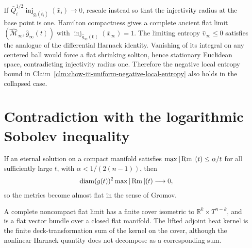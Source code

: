 \begin{lemma}
\label{lem:chow-iii-collapsed-entropy-limit}


If \(\bar Q_i^{1/2}\operatorname{inj}_{g_i(\bar t_i)}(\bar x_i)\to0\), rescale instead so that
the injectivity radius at the base point is one.  Hamilton compactness gives a
complete ancient flat limit \((\widehat{\mathcal M}_\infty,\widehat g_\infty(t))\)
with \(\operatorname{inj}_{\widehat g_\infty(0)}(\bar x_\infty)=1\).  The limiting entropy
\(\widehat v_\infty\le0\) satisfies the analogue of the differential Harnack
identity.  Vanishing of its integral on any centered ball would force a flat
shrinking soliton, hence stationary Euclidean space, contradicting injectivity
radius one.  Therefore the negative local entropy bound in Claim~\ref{clm:chow-iii-uniform-negative-local-entropy} also holds in the collapsed case.
\end{lemma}

\section{Contradiction with the logarithmic Sobolev inequality}

\begin{lemma}
\label{lem:chow-iii-type-iii-curvature-gap}

If an eternal solution on a compact manifold satisfies
\(\max|\operatorname{Rm}|(t)\le\alpha/t\) for all sufficiently large \(t\), with
\(\alpha<1/(2(n-1))\), then
\[
\operatorname{diam}(g(t))^2\max|\operatorname{Rm}|(t)\longrightarrow0,
\]
so the metrics become almost flat in the sense of Gromov.
\end{lemma}

\begin{remark}
\label{rem:chow-iii-flat-limit-cover}


A complete noncompact flat limit has a finite cover isometric to
\(\mathbb R^k\times T^{n-k}\), and is a flat vector bundle over a closed flat
manifold.  The lifted adjoint heat kernel is the finite deck-transformation sum
of the kernel on the cover, although the nonlinear Harnack quantity does not
decompose as a corresponding sum.
\end{remark}

